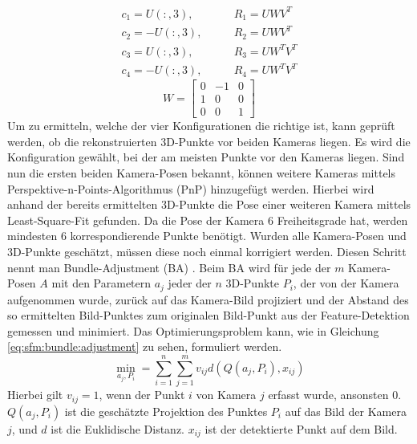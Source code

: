 \documentclass[12pt,titlepage, twoside]{article}
\begin{document}
\begin{equation}
    \label{eq:sfm:camera:pose}
    \begin{split}
    c_1=U(:,3),&\qquad R_1=UWV^T \\
    c_2=-U(:,3),&\qquad R_2=UWV^T \\
    c_3=U(:,3),&\qquad R_3=UW^TV^T \\
    c_4=-U(:,3),&\qquad R_4=UW^TV^T
    \end{split}
\end{equation}
\begin{equation}
    \label{eq:sfm:camera:pose:w}
W=\begin{bmatrix}
    0 & -1 & 0\\
    1 & 0 & 0\\
    0 & 0 & 1
\end{bmatrix}
\end{equation}
Um zu ermitteln, welche der vier Konfigurationen die richtige ist, kann geprüft werden, ob die rekonstruierten 3D-Punkte vor beiden Kameras liegen. 
Es wird die Konfiguration gewählt, bei der am meisten Punkte vor den Kameras liegen. 
Sind nun die ersten beiden Kamera-Posen bekannt, können weitere Kameras mittels Perspektive-n-Points-Algorithmus (PnP) \cite{pnp} hinzugefügt werden. 
Hierbei wird anhand der bereits ermittelten 3D-Punkte die Pose einer weiteren Kamera mittels Least-Square-Fit gefunden. Da die Pose der Kamera 6 Freiheitsgrade hat, werden mindesten 6 korrespondierende Punkte benötigt. 
Wurden alle Kamera-Posen und 3D-Punkte geschätzt, müssen diese noch einmal korrigiert werden. Diesen Schritt nennt man Bundle-Adjustment (BA) \cite{triggs1999bundle}.
Beim BA wird für jede der $m$ Kamera-Posen $A$ mit den Parametern $a_j$ jeder der $n$ 3D-Punkte $P_i$, der von der Kamera aufgenommen wurde, zurück auf das Kamera-Bild projiziert und 
der Abstand des so ermittelten Bild-Punktes zum originalen Bild-Punkt aus der Feature-Detektion gemessen und minimiert. 
Das Optimierungsproblem kann, wie in Gleichung \ref{eq:sfm:bundle:adjustment} zu sehen, formuliert werden. 
\begin{equation}
    \label{eq:sfm:bundle:adjustment}
    \min_{a_j, P_i} = \sum_{i=1}^n \sum_{j=1}^m v_{ij} d(Q(a_j, P_i), x_{ij})
\end{equation}
Hierbei gilt $v_{ij} = 1$, wenn der Punkt $i$ von Kamera $j$ erfasst wurde, ansonsten $0$.
$Q(a_j, P_i)$ ist die geschätzte Projektion des Punktes $P_i$ auf das Bild der Kamera $j$, und $d$ ist die Euklidische Distanz. $x_{ij}$ ist der detektierte Punkt auf dem Bild.
\end{document}
